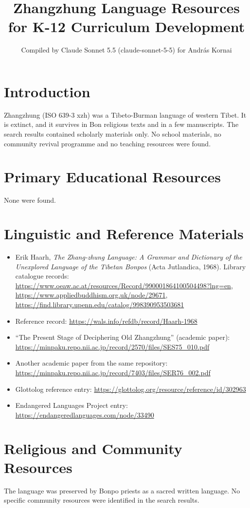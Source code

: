 \documentclass[12pt]{article}
\title{Zhangzhung Language Resources for K-12 Curriculum Development}
\author{Compiled by Claude Sonnet 5.5 (claude-sonnet-5-5) for Andr\'as Kornai}
\date{}
\begin{document}
\maketitle

\section{Introduction}
Zhangzhung (ISO 639-3 xzh) was a Tibeto-Burman language of western Tibet. It is extinct, and it survives in Bon religious texts and in a few manuscripts. The search results contained scholarly materials only. No school materials, no community revival programme and no teaching resources were found.

\section{Primary Educational Resources}
None were found.

\section{Linguistic and Reference Materials}
\begin{itemize}
\item Erik Haarh, \emph{The Zhang-zhung Language: A Grammar and Dictionary of the Unexplored Language of the Tibetan Bonpos} (Acta Jutlandica, 1968). Library catalogue records:
\url{https://www.oeaw.ac.at/resources/Record/990001864100504498?lng=en}, \url{https://www.appliedbuddhism.org.uk/node/29671}, \url{https://find.library.upenn.edu/catalog/998390953503681}
\item Reference record: \url{https://wals.info/refdb/record/Haarh-1968}
\item ``The Present Stage of Deciphering Old Zhangzhung'' (academic paper): \url{https://minpaku.repo.nii.ac.jp/record/2570/files/SES75_010.pdf}
\item Another academic paper from the same repository: \url{https://minpaku.repo.nii.ac.jp/record/7403/files/SER76_002.pdf}
\item Glottolog reference entry: \url{https://glottolog.org/resource/reference/id/302963}
\item Endangered Languages Project entry: \url{https://endangeredlanguages.com/node/33490}
\end{itemize}

\section{Religious and Community Resources}
The language was preserved by Bonpo priests as a sacred written language. No specific community resources were identified in the search results.
\end{document}

